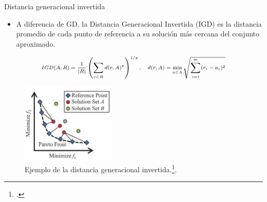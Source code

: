 \documentclass{beamer}
\begin{document}
\begin{frame}{Distancia generacional invertida}
\begin{itemize}
\justifying
\scriptsize
\item A diferencia de GD, la Distancia Generacional Invertida (IGD) es la distancia promedio de cada punto de referencia a su solución más cercana del conjunto aproximado.
\end{itemize}
\begin{equation*}
\scriptsize
\begin{split}
IGD(A; R) = \frac{1}{|R|} \left (   \sum_{r \in R} d(r, A)^p \right)^{1/p}, \quad d(r, A) = \min_{a \in A} \sqrt{\sum_{i=1}^m (r_i - a_i)^2}
\end{split}
\end{equation*}

\begin{figure}[H]
\centering
\includegraphics[width=0.4\textwidth]{igd_1.png}
\caption{\scriptsize Ejemplo de la distancia generacional invertida.\footcite{ishibuchi2016sensitivity}.}
\end{figure}
\end{frame}
\end{document}
